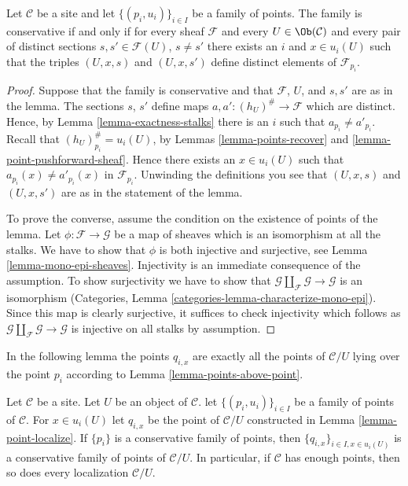 \begin{lemma}
\label{lemma-enough}
Let $\mathcal{C}$ be a site and let $\{(p_i, u_i)\}_{i\in I}$ be a
family of points. The family is conservative if and only if for every
sheaf $\mathcal{F}$ and every $U\in \Ob(\mathcal{C})$ and every
pair of distinct sections $s, s' \in \mathcal{F}(U)$, $s \not= s'$ there
exists an $i$ and $x\in u_i(U)$ such that the triples
$(U, x, s)$ and $(U, x, s')$ define distinct elements of
$\mathcal{F}_{p_i}$.
\end{lemma}

\begin{proof}
Suppose that the family is conservative and that $\mathcal{F}$, $U$, and
$s, s'$ are as in the lemma. The sections $s$, $s'$ define maps
$a, a' : (h_U)^\# \to \mathcal{F}$ which are distinct. Hence, by Lemma
\ref{lemma-exactness-stalks} there is an $i$ such that $a_{p_i}
\not = a'_{p_i}$. Recall that $(h_U)^\#_{p_i} = u_i(U)$, by
Lemmas \ref{lemma-points-recover} and
\ref{lemma-point-pushforward-sheaf}.
Hence there exists an $x \in u_i(U)$ such that $a_{p_i}(x)
\not = a'_{p_i}(x)$ in $\mathcal{F}_{p_i}$.
Unwinding the definitions you see that $(U, x, s)$
and $(U, x, s')$ are as in the statement of the lemma.

\medskip\noindent
To prove the converse, assume the condition on the existence of
points of the lemma. Let $\phi : \mathcal{F} \to \mathcal{G}$
be a map of sheaves which is an isomorphism at all the stalks.
We have to show that $\phi$ is both
injective and surjective, see Lemma \ref{lemma-mono-epi-sheaves}.
Injectivity is an immediate consequence of the assumption.
To show surjectivity we have to show that
$\mathcal{G} \amalg_\mathcal{F} \mathcal{G} \to \mathcal{G}$
is an isomorphism
(Categories, Lemma \ref{categories-lemma-characterize-mono-epi}).
Since this map is clearly surjective, it suffices to check injectivity
which follows as $\mathcal{G} \amalg_\mathcal{F} \mathcal{G} \to \mathcal{G}$
is injective on all stalks by assumption.
\end{proof}

\noindent
In the following lemma the points $q_{i, x}$ are exactly all the points
of $\mathcal{C}/U$ lying over the point $p_i$ according to
Lemma \ref{lemma-points-above-point}.

\begin{lemma}
\label{lemma-localize-enough}
Let $\mathcal{C}$ be a site. Let $U$ be an object of $\mathcal{C}$.
let $\{(p_i, u_i)\}_{i\in I}$ be a family of points of $\mathcal{C}$.
For $x \in u_i(U)$ let $q_{i, x}$ be the point of $\mathcal{C}/U$
constructed in
Lemma \ref{lemma-point-localize}.
If $\{p_i\}$ is a conservative family of points, then
$\{q_{i, x}\}_{i \in I, x \in u_i(U)}$ is a conservative
family of points of $\mathcal{C}/U$.
In particular, if $\mathcal{C}$ has enough points, then so
does every localization $\mathcal{C}/U$.
\end{lemma}

